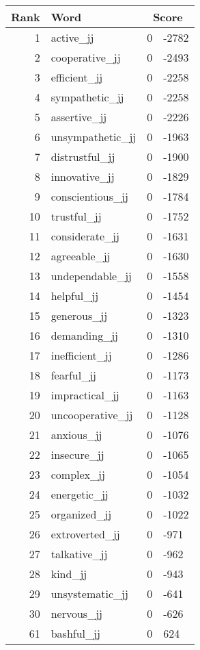 \begin{longtable}[!htbp]{| rlr@{.}l |}
    \hline
    \textbf{Rank} & \textbf{Word} & \multicolumn{2}{c|}{\textbf{Score}} \\
    \hline
    \endhead
    1 & active\_jj & 0 & -2782 \\
    2 & cooperative\_jj & 0 & -2493 \\
    3 & efficient\_jj & 0 & -2258 \\
    4 & sympathetic\_jj & 0 & -2258 \\
    5 & assertive\_jj & 0 & -2226 \\
    6 & unsympathetic\_jj & 0 & -1963 \\
    7 & distrustful\_jj & 0 & -1900 \\
    8 & innovative\_jj & 0 & -1829 \\
    9 & conscientious\_jj & 0 & -1784 \\
    10 & trustful\_jj & 0 & -1752 \\
    11 & considerate\_jj & 0 & -1631 \\
    12 & agreeable\_jj & 0 & -1630 \\
    13 & undependable\_jj & 0 & -1558 \\
    14 & helpful\_jj & 0 & -1454 \\
    15 & generous\_jj & 0 & -1323 \\
    16 & demanding\_jj & 0 & -1310 \\
    17 & inefficient\_jj & 0 & -1286 \\
    18 & fearful\_jj & 0 & -1173 \\
    19 & impractical\_jj & 0 & -1163 \\
    20 & uncooperative\_jj & 0 & -1128 \\
    21 & anxious\_jj & 0 & -1076 \\
    22 & insecure\_jj & 0 & -1065 \\
    23 & complex\_jj & 0 & -1054 \\
    24 & energetic\_jj & 0 & -1032 \\
    25 & organized\_jj & 0 & -1022 \\
    26 & extroverted\_jj & 0 & -971 \\
    27 & talkative\_jj & 0 & -962 \\
    28 & kind\_jj & 0 & -943 \\
    29 & unsystematic\_jj & 0 & -641 \\
    30 & nervous\_jj & 0 & -626 \\
    61 & bashful\_jj & 0 & 624 \\

\end{longtable}
